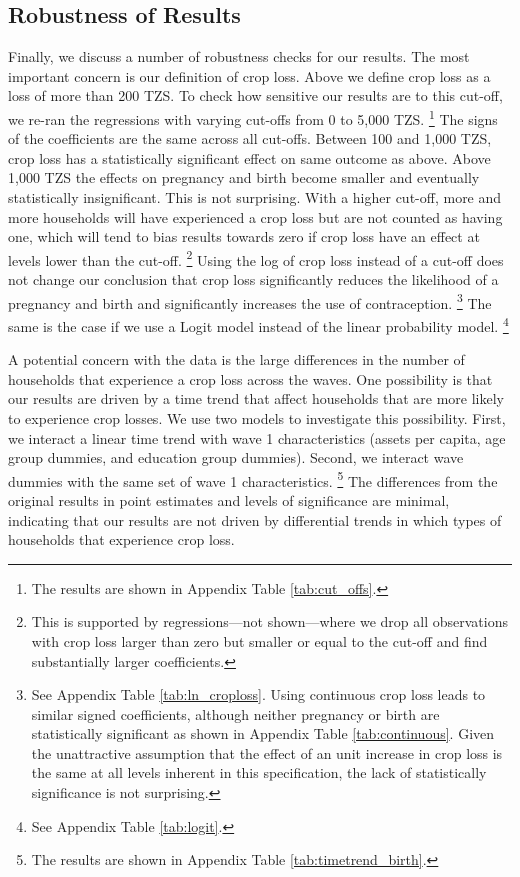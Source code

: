 \documentclass[letterpaper,12pt]{article}
\begin{document}
\subsection{Robustness of Results\label{sec:robustness}}

Finally, we discuss a number of robustness checks for our results.
The most important concern is our definition of crop loss.
Above we define crop loss as a loss of more than 200 TZS.
To check how sensitive our results are to this cut-off,
we re-ran the regressions with varying cut-offs from 
0 to 5,000 TZS.%
\footnote{
The results are shown in Appendix Table \ref{tab:cut_offs}.
}
The signs of the coefficients are the same across all cut-offs.
Between 100 and 1,000 TZS, crop loss has a statistically significant
effect on same outcome as above.
Above 1,000 TZS the effects on pregnancy and birth become smaller and 
eventually statistically insignificant.
This is not surprising.
With a higher cut-off, more and more households will have experienced 
a crop loss but are not counted as having one, which will tend to 
bias results towards zero if crop loss have an effect at levels 
lower than the cut-off.%
\footnote{
This is supported by regressions---not shown---where we drop all observations 
with crop loss larger than zero but smaller or equal to the cut-off and find 
substantially larger coefficients.
} 
Using the log of crop loss instead of a cut-off does
not change our conclusion that crop loss significantly reduces
the likelihood of a pregnancy and birth and significantly
increases the use of contraception.%
\footnote{
See Appendix Table \ref{tab:ln_croploss}.
Using continuous crop loss leads to similar signed coefficients,
although neither pregnancy or birth are statistically significant
as shown in Appendix Table \ref{tab:continuous}.
Given the unattractive assumption that the effect of an unit
increase in crop loss is the same at all levels inherent in
this specification, the lack of statistically significance is
not surprising. 
}
The same is the case if we use a Logit model instead of the
linear probability model.%
\footnote{
See Appendix Table \ref{tab:logit}.
}

A potential concern with the data is the large differences in
the number of households that experience a crop loss across
the waves.
One possibility is that our results are driven by a time
trend that affect households that are more likely to
experience crop losses.
We use two models to investigate this possibility.
First, we interact a linear time trend with wave 1 characteristics 
(assets per capita, age group dummies, and education group dummies).
Second, we interact wave dummies with the same set of wave 1 
characteristics.%
\footnote{
The results are shown in Appendix Table \ref{tab:timetrend_birth}.
}
The differences from the original results in point estimates 
and levels of significance are minimal, indicating that 
our results are not driven by differential trends in which 
types of households that experience crop loss.
\end{document}
